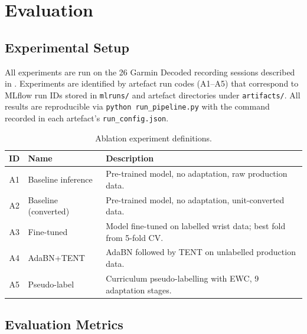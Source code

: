 \chapter{Evaluation}
\label{ch:evaluation}

\section{Experimental Setup}
\label{sec:experimental_setup}

All experiments are run on the 26 Garmin Decoded recording sessions described
in .
Experiments are identified by artefact run codes (A1--A5) that correspond to
MLflow run IDs stored in \texttt{mlruns/} and artefact directories under
\texttt{artifacts/}.
All results are reproducible via \texttt{python run\_pipeline.py} with the
command recorded in each artefact's \texttt{run\_config.json}.

\begin{table}[ht]
  \centering
  \caption{Ablation experiment definitions.}
  \label{tab:ablation_experiments}
  \begin{tabularx}{\linewidth}{clX}
    \toprule
    \textbf{ID} & \textbf{Name} & \textbf{Description} \\
    \midrule
    A1 & Baseline inference
       & Pre-trained model, no adaptation, raw production data. \\
    A2 & Baseline (converted)
       & Pre-trained model, no adaptation, unit-converted data. \\
    A3 & Fine-tuned
       & Model fine-tuned on labelled wrist data; best fold from 5-fold CV. \\
    A4 & AdaBN+TENT
       & AdaBN followed by TENT on unlabelled production data. \\
    A5 & Pseudo-label
       & Curriculum pseudo-labelling with EWC, 9 adaptation stages. \\
    \bottomrule
  \end{tabularx}
\end{table}

\section{Evaluation Metrics}

